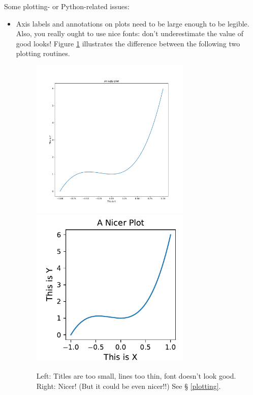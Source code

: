 \documentclass[12pt,preprint]{aastex}
\begin{document}
	Some plotting- or Python-related issues: \begin{itemize}

	\item Axis labels and annotations on plots need to be large
enough to be legible.  Also, you really ought to use nice fonts: don't
underestimate the value of good looks! Figure \ref{simple} illustrates
the difference between the following two plotting routines.





\begin{figure}[b!]
\begin{center} 
\includegraphics[width=3in]{simple.pdf}
\includegraphics[width=3in]{nicer.pdf}
\end{center}
\caption{Left: Titles are too small, lines too thin, font doesn't look
good. Right: Nicer! (But it could be even nicer!!) See \S
\ref{plotting}.  \label{simple}}
\end{figure}
                                                                        


\end{itemize}
\end{document}
